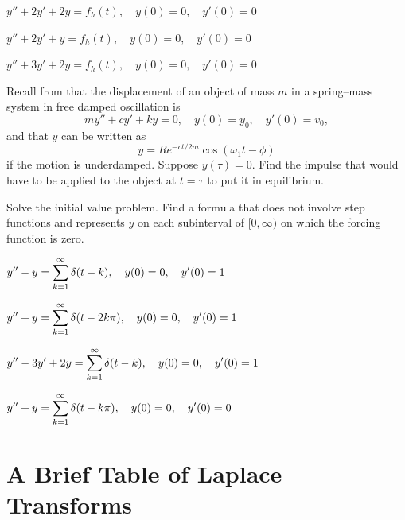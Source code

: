 \begin{exerciselist}
\item\label{exer:8.7.26}\Lex
$y''+2y'+2y=f_h(t), \quad  y(0)=0,\quad y'(0)=0$

\item\label{exer:8.7.27}\Lex
$y''+2y'+y=f_h(t), \quad  y(0)=0,\quad y'(0)=0$

\item\label{exer:8.7.28}\Lex
$y''+3y'+2y=f_h(t), \quad  y(0)=0,\quad y'(0)=0$


\item\label{exer:8.7.29}Recall from  that the displacement of
an
object of mass $m$ in a spring--mass system in free damped oscillation is
\[
my''+cy'+ky=0, \quad  y(0)=y_0,\quad y'(0)=v_0,
\]
and that $y$ can be written as
\[
y=Re^{-ct/2m}\cos(\omega_1t-\phi)
\]
if the motion is underdamped. Suppose $y(\tau)=0$.
Find the impulse that would have to be applied to the object at $t=\tau$
 to put it in equilibrium.

\item\label{exer:8.7.30}Solve the initial value problem. Find a formula that
does not involve step functions and represents $y$  on each subinterval of
$[0,\infty)$  on which the forcing function is zero.

\begin{alist}
\item $\displaystyle{y''-y=\sum_{k=1}^\infty\delta(t-k), \quad  y(0)=0,\quad y'(0)=1}$
\item $\displaystyle{y''+y=\sum_{k=1}^\infty\delta(t-2k\pi), \quad  y(0)=0,\quad y'(0)=1}$
\item $\displaystyle{y''-3y'+2y=\sum_{k=1}^\infty\delta(t-k), \quad  y(0)=0,\quad y'(0)=1}$
\item $\displaystyle{y''+y=\sum_{k=1}^\infty\delta(t-k\pi), \quad  y(0)=0,\quad y'(0)=0}$
\end{alist}

\end{exerciselist}

\newpage


\section{A Brief Table of Laplace Transforms}\label{sec:laplace_table}

